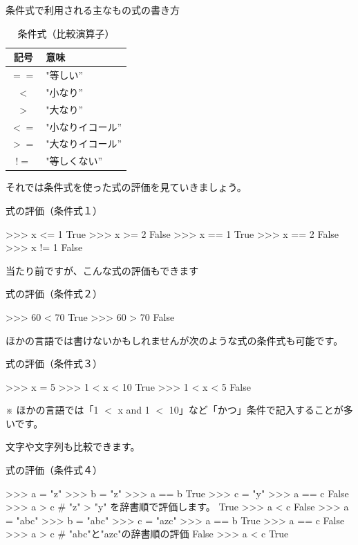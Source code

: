 \documentclass[11pt,a4paper,dvipdfmx,titlepage]{jsreport}
\begin{document}
条件式で利用される主なもの式の書き方
\begin{table}[h]
 \begin{center}
    \caption{条件式（比較演算子）}
\begin{tabular}{|c|p{4cm}|} 
\hline
記号 & 意味　\\ \hline \hline
 $ == $ & "等しい” \\ \hline
 $ < $ & "小なり” \\ \hline
 $ > $ & "大なり” \\ \hline
 $ <= $ & "小なりイコール” \\ \hline
 $ >= $ & "大なりイコール” \\ \hline
 $ != $ & "等しくない” \\ \hline
\end{tabular}
\end{center}
\end{table}


それでは条件式を使った式の評価を見ていきましょう。
\begin{grabox}{式の評価（条件式１）}
\begin{listingcont}
>>> x <= 1
True
>>> x >= 2
False
>>> x == 1
True
>>> x == 2
False
>>>  x != 1
False
\end{listingcont}
\end{grabox}

当たり前ですが、こんな式の評価もできます
\begin{grabox}{式の評価（条件式２）}
\begin{listingcont}
>>> 60 < 70
True
>>> 60 > 70
False
\end{listingcont}
\end{grabox}
ほかの言語では書けないかもしれませんが次のような式の条件式も可能です。
\begin{grabox}{{式の評価（条件式３）}}
\begin{listing}{1}
>>> x = 5
>>> 1 < x < 10
True
>>> 1 < x < 5
False
\end{listing}
\end{grabox}
※ ほかの言語では「1 $<$ x and 1 $<$ 10」など「かつ」条件で記入することが多いです。

文字や文字列も比較できます。
\begin{grabox}{{式の評価（条件式４）}}
\begin{listing}{1}
>>> a = "z"
>>> b = "z"
>>> a == b
True
>>> c = "y"
>>> a == c
False
>>> a > c # "z" > "y" を辞書順で評価します。
True
>>> a < c
False
>>> a = "abc"
>>> b = "abc"
>>> c = "azc"
>>> a == b
True
>>> a == c
False
>>> a > c # "abc"と"azc"の辞書順の評価
False
>>> a < c
True
\end{listing}
\end{grabox}
\end{document}
